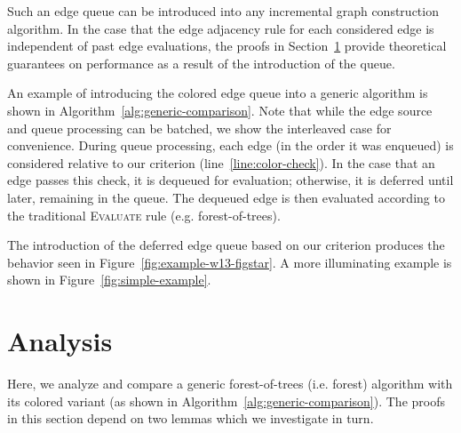 \documentclass{report}
\begin{document}
Such an edge queue can be introduced into any incremental graph construction
algorithm.
In the case that the edge adjacency rule for each considered edge
is independent of past edge evaluations,
the proofs in Section~\ref{sec:analysis} provide theoretical guarantees
on performance as a result of the introduction of the queue.

An example of introducing the colored edge queue into a generic algorithm
is shown in Algorithm~\ref{alg:generic-comparison}.
Note that while the edge source and queue processing can be batched,
we show the interleaved case for convenience.
During queue processing,
each edge (in the order it was enqueued)
is considered relative to our criterion (line~\ref{line:color-check}).
In the case that an edge passes this check,
it is dequeued for evaluation;
otherwise, it is deferred until later, remaining in the queue.
The dequeued edge is then evaluated according to the traditional
\textsc{Evaluate} rule (e.g. forest-of-trees).

The introduction of the deferred edge queue based on our criterion
produces the behavior seen in Figure~\ref{fig:example-w13-figstar}.
A more illuminating example is shown in
Figure~\ref{fig:simple-example}.

\section{Analysis}
\label{sec:analysis}

Here, we analyze and compare a generic forest-of-trees (i.e. forest)
algorithm with its colored variant
(as shown in Algorithm~\ref{alg:generic-comparison}).
The proofs in this section depend on two lemmas which we investigate
in turn.
\end{document}
